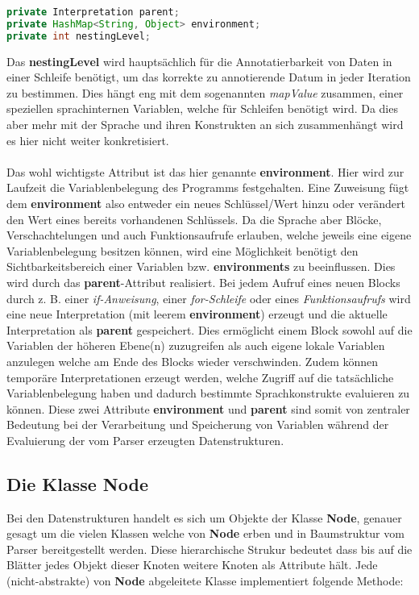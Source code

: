 \begin{lstlisting}[caption=Attribute der Klasse Interpretation, language=Java]
private Interpretation parent;
private HashMap<String, Object> environment;
private int nestingLevel;
\end{lstlisting}
Das \textbf{nestingLevel} wird hauptsächlich für die Annotatierbarkeit von Daten in einer Schleife benötigt, um das korrekte zu annotierende Datum in jeder Iteration zu bestimmen. Dies hängt eng mit dem sogenannten \textit{mapValue} zusammen, einer speziellen sprachinternen Variablen, welche für Schleifen benötigt wird. Da dies aber mehr mit der Sprache und ihren Konstrukten an sich zusammenhängt wird es hier nicht weiter konkretisiert.
\\\\
Das wohl wichtigste Attribut ist das hier genannte \textbf{environment}. Hier wird zur Laufzeit die Variablenbelegung des Programms festgehalten. Eine Zuweisung fügt dem \textbf{environment} also entweder ein neues Schlüssel/Wert hinzu oder verändert den Wert eines bereits vorhandenen Schlüssels. Da die Sprache aber Blöcke, Verschachtelungen und auch Funktionsaufrufe erlauben, welche jeweils eine eigene Variablenbelegung besitzen können, wird eine Möglichkeit benötigt den Sichtbarkeitsbereich einer Variablen bzw. \textbf{environments}  zu beeinflussen. Dies wird durch das \textbf{parent}-Attribut realisiert. Bei jedem Aufruf eines neuen Blocks durch z. B. einer \textit{if-Anweisung}, einer \textit{for-Schleife} oder eines \textit{Funktionsaufrufs} wird eine neue Interpretation (mit leerem \textbf{environment}) erzeugt und die aktuelle Interpretation als \textbf{parent} gespeichert. Dies ermöglicht einem Block sowohl auf die Variablen der höheren Ebene(n) zuzugreifen als auch eigene lokale Variablen anzulegen welche am Ende des Blocks wieder verschwinden. Zudem können temporäre Interpretationen erzeugt werden, welche Zugriff auf die tatsächliche Variablenbelegung haben und dadurch bestimmte Sprachkonstrukte evaluieren zu können. Diese zwei Attribute \textbf{environment} und \textbf{parent} sind somit von zentraler Bedeutung bei der Verarbeitung und Speicherung von Variablen während der Evaluierung der vom Parser erzeugten Datenstrukturen.


\subsection{Die Klasse Node}
\label{Node}
Bei den Datenstrukturen handelt es sich um Objekte der Klasse \textbf{Node}, genauer gesagt um die vielen Klassen welche von \textbf{Node} erben und in Baumstruktur vom Parser bereitgestellt werden. Diese hierarchische Strukur bedeutet dass bis auf die Blätter jedes Objekt dieser Knoten weitere Knoten als Attribute hält. Jede (nicht-abstrakte) von \textbf{Node} abgeleitete Klasse implementiert folgende Methode:


